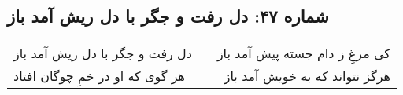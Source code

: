 \begin{center}
\section*{شماره ۴۷: دل رفت و جگر با دل ریش آمد باز}
\label{sec:047}
\begin{longtable}{l p{0.5cm} r}
دل رفت و جگر با دل ریش آمد باز
&&
کی مرغِ ز دام جسته پیش آمد باز
\\
هر گوی که او در خمِ چوگان افتاد
&&
هرگز نتواند که به خویش آمد باز
\\
\end{longtable}
\end{center}
